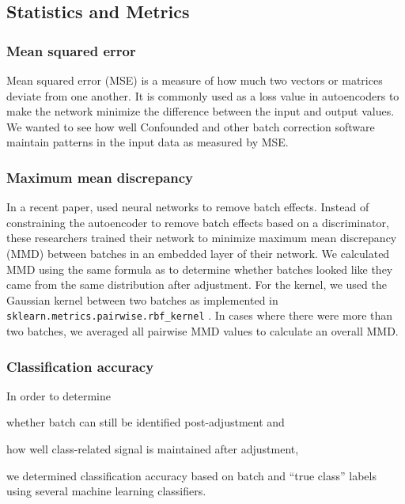 \documentclass[12pt]{article}
\begin{document}
\subsection{Statistics and Metrics}

\subsubsection{Mean squared error}

Mean squared error (MSE) is a measure of how much two vectors or matrices deviate from one another.
It is commonly used as a loss value in autoencoders to make the network minimize the difference between the input and output values.
We wanted to see how well Confounded and other batch correction software maintain patterns in the input data as measured by MSE.

\subsubsection{Maximum mean discrepancy} \label{section:mmd}

In a recent paper, \citet{shaham_removal_2017} used neural networks to remove batch effects.
Instead of constraining the autoencoder to remove batch effects based on a discriminator, these researchers trained their network to minimize maximum mean discrepancy (MMD) between batches in an embedded layer of their network.
We calculated MMD using the same formula as \citeauthor{shaham_removal_2017} to determine whether batches looked like they came from the same distribution after adjustment.
For the kernel, we used the Gaussian kernel between two batches as implemented in \texttt{sklearn.metrics.pairwise.rbf\_kernel} \cite{pedregosa_scikit-learn_2011}.
In cases where there were more than two batches, we averaged all pairwise MMD values to calculate an overall MMD.

\subsubsection{Classification accuracy}

In order to determine \begin{enumerate*}[(a)]
	\item whether batch can still be identified post-adjustment and
	\item how well class-related signal is maintained after adjustment,
\end{enumerate*}
we determined classification accuracy based on batch and ``true class'' labels using several machine learning classifiers.
\end{document}
